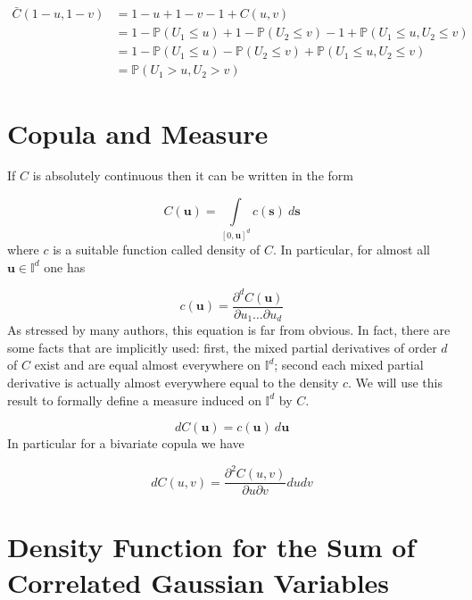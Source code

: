 \documentclass{article}
\begin{document}
\begin{align}
\bar C (1-u, 1- v) & = 1 - u + 1 - v - 1 + C(u, v) \\
& = 1 - \mathbb{P} (U_1 \le u) + 1 - \mathbb{P} (U_2 \le v) - 1 + \mathbb{P} (U_1 \le u, U_2 \le v) \\
& = 1 - \mathbb{P} (U_1 \le u) - \mathbb{P} (U_2 \le v) + \mathbb{P} (U_1 \le u, U_2 \le v) \\
& = \mathbb{P} (U_1 > u, U_2 > v)
\end{align}
%
%
\section{Copula and Measure}

If $C$ is absolutely continuous then it can be written in the form 

\begin{equation}
C(\mathbf{u}) = \int\limits_{[0, \mathbf{u}]^d} c(\mathbf{s}) \> d \mathbf{s}
\end{equation}
where $c$ is a suitable function called density of $C$. In particular, for almost all $\mathbf{u} \in \mathbb{I}^d$ one has

\begin{equation}
c(\mathbf{u}) = \frac{\partial^d C(\mathbf{u})}{\partial u_1 \dots \partial u_d}
\end{equation}
As stressed by many authors, this equation is far from obvious. In fact, there are some facts that are implicitly used: first, the mixed partial derivatives of order $d$ of $C$ exist and are equal almost everywhere on $\mathbb{I}^d$; second each mixed partial derivative is actually almost everywhere equal to the density $c$. We will use this result to formally define a measure induced on $\mathbb{I}^d$ by $C$. 

\begin{equation}
dC(\mathbf{u}) = c(\mathbf{u}) \> d \mathbf{u}
\end{equation}
In particular for a bivariate copula we have

\begin{equation}
dC(u, v) = \frac{\partial^2 C(u, v)}{\partial u \partial v} du dv
\end{equation}
%
%
\section{Density Function for the Sum of Correlated Gaussian Variables}
\end{document}
